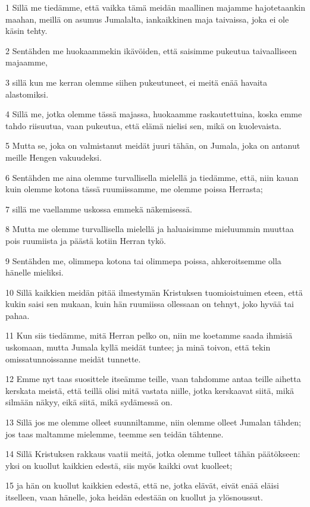 \par 1 Sillä me tiedämme, että vaikka tämä meidän maallinen majamme hajotetaankin maahan, meillä on asumus Jumalalta, iankaikkinen maja taivaissa, joka ei ole käsin tehty.
\par 2 Sentähden me huokaammekin ikävöiden, että saisimme pukeutua taivaalliseen majaamme,
\par 3 sillä kun me kerran olemme siihen pukeutuneet, ei meitä enää havaita alastomiksi.
\par 4 Sillä me, jotka olemme tässä majassa, huokaamme raskautettuina, koska emme tahdo riisuutua, vaan pukeutua, että elämä nielisi sen, mikä on kuolevaista.
\par 5 Mutta se, joka on valmistanut meidät juuri tähän, on Jumala, joka on antanut meille Hengen vakuudeksi.
\par 6 Sentähden me aina olemme turvallisella mielellä ja tiedämme, että, niin kauan kuin olemme kotona tässä ruumiissamme, me olemme poissa Herrasta;
\par 7 sillä me vaellamme uskossa emmekä näkemisessä.
\par 8 Mutta me olemme turvallisella mielellä ja haluaisimme mieluummin muuttaa pois ruumiista ja päästä kotiin Herran tykö.
\par 9 Sentähden me, olimmepa kotona tai olimmepa poissa, ahkeroitsemme olla hänelle mieliksi.
\par 10 Sillä kaikkien meidän pitää ilmestymän Kristuksen tuomioistuimen eteen, että kukin saisi sen mukaan, kuin hän ruumiissa ollessaan on tehnyt, joko hyvää tai pahaa.
\par 11 Kun siis tiedämme, mitä Herran pelko on, niin me koetamme saada ihmisiä uskomaan, mutta Jumala kyllä meidät tuntee; ja minä toivon, että tekin omissatunnoissanne meidät tunnette.
\par 12 Emme nyt taas suosittele itseämme teille, vaan tahdomme antaa teille aihetta kerskata meistä, että teillä olisi mitä vastata niille, jotka kerskaavat siitä, mikä silmään näkyy, eikä siitä, mikä sydämessä on.
\par 13 Sillä jos me olemme olleet suunniltamme, niin olemme olleet Jumalan tähden; jos taas maltamme mielemme, teemme sen teidän tähtenne.
\par 14 Sillä Kristuksen rakkaus vaatii meitä, jotka olemme tulleet tähän päätökseen: yksi on kuollut kaikkien edestä, siis myös kaikki ovat kuolleet;
\par 15 ja hän on kuollut kaikkien edestä, että ne, jotka elävät, eivät enää eläisi itselleen, vaan hänelle, joka heidän edestään on kuollut ja ylösnoussut.
